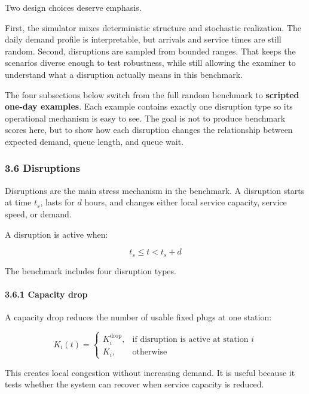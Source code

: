 \documentclass[11pt]{article}
\begin{document}
    Two design choices deserve emphasis.

First, the simulator mixes deterministic structure and stochastic
realization. The daily demand profile is interpretable, but arrivals and
service times are still random. Second, disruptions are sampled from
bounded ranges. That keeps the scenarios diverse enough to test
robustness, while still allowing the examiner to understand what a
disruption actually means in this benchmark.

The four subsections below switch from the full random benchmark to
\textbf{scripted one-day examples}. Each example contains exactly one
disruption type so its operational mechanism is easy to see. The goal is
not to produce benchmark scores here, but to show how each disruption
changes the relationship between expected demand, queue length, and
queue wait.

    \subsubsection{3.6 Disruptions}\label{disruptions}

Disruptions are the main stress mechanism in the benchmark. A disruption
starts at time \(t_s\), lasts for \(d\) hours, and changes either local
service capacity, service speed, or demand.

A disruption is active when:

\[
t_s \leq t < t_s + d
\]

The benchmark includes four disruption types.

    \paragraph{3.6.1 Capacity drop}\label{capacity-drop}

A capacity drop reduces the number of usable fixed plugs at one station:

\[
K_i(t) =
\begin{cases}
K_i^{\mathrm{drop}}, & \text{if disruption is active at station } i \\
K_i, & \text{otherwise}
\end{cases}
\]

This creates local congestion without increasing demand. It is useful
because it tests whether the system can recover when service capacity is
reduced.

    \begin{center}
    \end{center}
    { \hspace*{\fill} \\}
    
\end{document}
